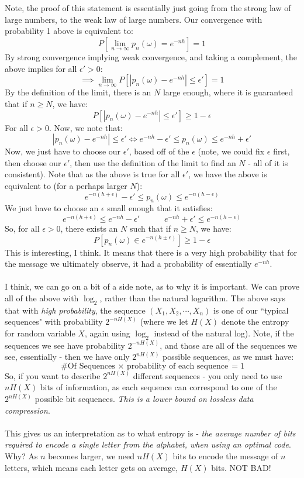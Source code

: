 \documentclass[12pt,a4paper]{article}
\newcommand{\1}[1]{\mathbbm{1}\left\{ #1 \right\}}
\begin{document}
\\\\
Note, the proof of this statement is essentially just going from the strong law of large numbers, to the weak law of large numbers. Our convergence with probability 1 above is equivalent to:
$$
	P\left[\lim_{n \to \infty} p_n(\omega) = e^{-nh}\right] = 1
$$
By strong convergence implying weak convergence, and taking a complement, the above implies for all $\epsilon' > 0$:
$$
	\implies
	\lim_{n \to \infty} P\left[|p_n(\omega) - e^{-nh}| \leq \epsilon'\right] = 1
$$
By the definition of the limit, there is an $N$ large enough, where it is guaranteed that if $n \geq N$, we have:
$$
	P\left[|p_n(\omega) - e^{-nh}| \leq \epsilon'\right] \geq 1 - \epsilon
$$
For all $\epsilon > 0$. Now, we note that:
$$
	|p_n(\omega) - e^{-nh}| \leq \epsilon' \iff 
	e^{-nh} - \epsilon' \leq p_n(\omega) \leq e^{-nh} + \epsilon'
$$
Now, we just have to choose our $\epsilon'$, based off of the $\epsilon$ (note, we could fix $\epsilon$ first, then choose our $\epsilon'$, then use the definition of the limit to find an $N$ - all of it is consistent). Note that as the above is true for all $\epsilon'$, we have the above is equivalent to (for a perhaps larger $N$):
$$
	e^{-n(h + \epsilon)} - \epsilon' \leq p_n(\omega) \leq e^{-n(h - \epsilon)}
$$
We just have to choose an $\epsilon$ small enough that it satisfies:
$$
	e^{-n(h + \epsilon)} \leq e^{-nh} - \epsilon' \quad\quad\quad
	e^{-nh} + \epsilon' \leq e^{-n(h - \epsilon)}
$$
So, for all $\epsilon > 0$, there exists an $N$ such that if $n \geq N$, we have:
$$
	P\left[p_n(\omega) \in e^{-n(h \pm \epsilon)}\right] \geq 1 - \epsilon
$$
This is interesting, I think. It means that there is a very high probability that for the message we ultimately observe, it had a probability of essentially $e^{-nh}$.
\\\\
I think, we can go on a bit of a side note, as to why it is important. We can prove all of the above with $\log_2$, rather than the natural logarithm. The above says that with \textit{high probability}, the sequence $(X_1, X_2, \cdots, X_n)$ is one of our ``typical sequences" with probability $2^{-nH(X)}$ (where we let $H(X)$ denote the entropy for random variable $X$, again using $\log_2$ instead of the natural log). Note, if the sequences we see have probability $2^{-nH(X)}$, and those are all of the sequences we see, essentially - then we have only $2^{nH(X)}$ possible sequences, as we must have:
$$
	\text{\# Of Sequences $\times$ probability of each sequence} = 1
$$
So, if you want to describe $2^{nH(X)}$ different sequences - you only need to use $nH(X)$ bits of information, as each sequence can correspond to one of the $2^{nH(X)}$ possible bit sequences. \textit{This is a lower bound on lossless data compression}.
\\\\
This gives us an interpretation as to what entropy is - \textit{the average number of bits required to encode a \textit{single letter} from the alphabet, when using an optimal code}. Why? As $n$ becomes larger, we need $nH(X)$ bits to encode the message of $n$ letters, which means each letter gets on average, $H(X)$ bits. NOT BAD!
\end{document}
